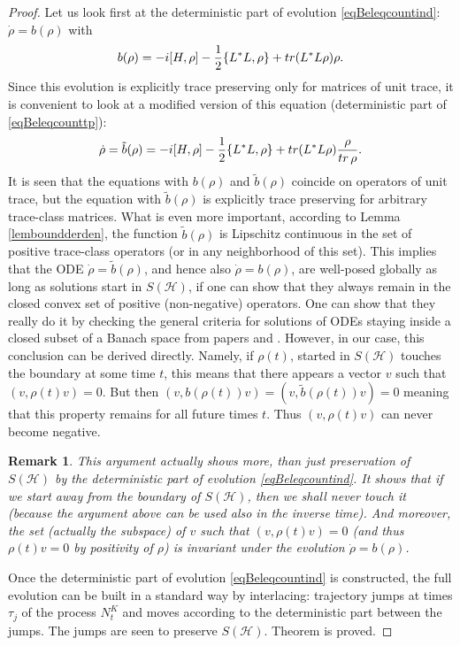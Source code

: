 \documentclass[10pt,a4paper]{amsart}
\def\HC{\mathcal{H}}
\def\tr{\rm{tr}}
\newtheorem{remark}{Remark}
\begin{document}
\begin{proof}
Let us look first at the deterministic part of evolution \eqref{eqBeleqcountind}:
$\dot \rho= b(\rho)$ with
\[
b(\rho)= -i[H, \rho] -\frac12 \{L^*L,\rho\}+ {\tr} (L^*L\rho) \rho.
\]
Since this evolution is explicitly trace preserving only for matrices of unit trace, it is convenient
to look at a modified version of this equation (deterministic part of \eqref{eqBeleqcounttp}):
\[
\dot \rho=\tilde b(\rho)=-i[H, \rho] -\frac12 \{L^*L,\rho\}+ {\tr} (L^*L\rho) \frac{\rho}{{\tr}\, \rho}.
\]
It is seen that the equations with $b(\rho)$ and $\tilde b(\rho)$ coincide
on operators of unit trace, but the equation with $\tilde b(\rho)$ is explicitly
trace preserving for arbitrary trace-class matrices. What is even more important,
according to Lemma \ref{lemboundderden}, the function $\tilde b(\rho)$ is Lipschitz
continuous in the set of positive trace-class operators (or in any neighborhood of
this set). This implies that the ODE $\dot \rho=\tilde b(\rho)$, and hence also
$\dot \rho=b(\rho)$, are well-posed globally as long as solutions start in $S(\HC)$,
if one can show that they always remain in the closed convex set of positive (non-negative) operators.
One can show that they really do it by checking
the general criteria for solutions of ODEs staying inside a closed subset of a Banach space from papers
 \cite{Martin} and \cite{Lakshm}. However, in our case, this conclusion can be derived directly. Namely, if
 $\rho(t)$, started in $S(\HC)$ touches the boundary at some time $t$, this means that there appears
  a vector $v$ such that $(v,\rho(t) v)=0$. But then $(v, b(\rho(t)) v)=(v,\tilde b(\rho(t))v)=0$ meaning
  that this property remains for all future times $t$. Thus $(v,\rho(t)v)$ can never become negative.

\begin{remark} This argument actually shows more, than just preservation of $S(\HC)$
by the deterministic part of evolution \eqref{eqBeleqcountind}. It shows that if
we start away from the boundary of $S(\HC)$, then we shall never touch it (because
the argument above can be used also in the inverse time). And moreover,
the set (actually the subspace) of $v$ such that $(v, \rho(t) v)=0$
(and thus $\rho(t)v=0$ by positivity of $\rho$)
is invariant under the evolution $\dot \rho=b(\rho)$.
\end{remark}

Once the deterministic part of  evolution \eqref{eqBeleqcountind} is constructed,
the full evolution can be built in a standard way by interlacing: trajectory jumps
at times $\tau_j$ of the process $N_t^K$ and moves according to the deterministic
part between the jumps. The jumps are seen to preserve $S(\HC)$. Theorem is proved.
\end{proof}
\end{document}
